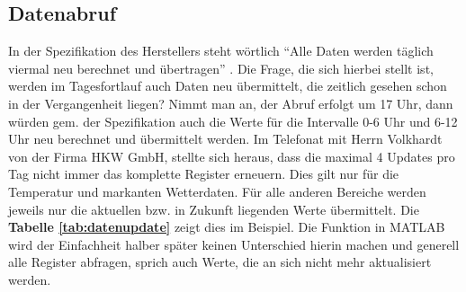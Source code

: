 \subsection{Datenabruf}
In der Spezifikation des Herstellers steht wörtlich \enquote{Alle Daten werden täglich viermal neu berechnet und übertragen} \cite[S. 4]{HKWDoc}. Die Frage, die sich hierbei stellt ist, werden im Tagesfortlauf auch Daten neu übermittelt, die zeitlich gesehen schon in der Vergangenheit liegen? Nimmt man an, der Abruf erfolgt um 17 Uhr, dann würden gem. der Spezifikation auch die Werte für die Intervalle 0-6 Uhr und 6-12 Uhr neu berechnet und übermittelt werden. Im Telefonat mit Herrn Volkhardt von der Firma HKW GmbH, stellte sich heraus, dass die maximal 4 Updates pro Tag nicht immer das komplette Register erneuern. Dies gilt nur für die Temperatur und markanten Wetterdaten. Für alle anderen Bereiche werden jeweils nur die aktuellen bzw. in Zukunft liegenden Werte übermittelt. Die \textbf{Tabelle \ref{tab:datenupdate}} zeigt dies im Beispiel. Die Funktion in MATLAB wird der Einfachheit halber später keinen Unterschied hierin machen und generell alle Register abfragen, sprich auch Werte, die an sich nicht mehr aktualisiert werden.
